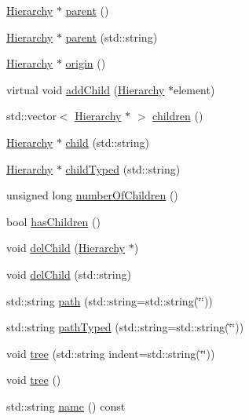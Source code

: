 \begin{DoxyCompactItemize}
\item 
\hyperlink{classHierarchy}{Hierarchy} $\ast$ \hyperlink{classHierarchy_a1c7bec8257e717f9c1465e06ebf845fc}{parent} ()
\item 
\hyperlink{classHierarchy}{Hierarchy} $\ast$ \hyperlink{classHierarchy_ad550588733bf75ac5c0fcfd7c8fd11a6}{parent} (std\+::string)
\item 
\hyperlink{classHierarchy}{Hierarchy} $\ast$ \hyperlink{classHierarchy_aee461dc930ce3871636ff87f075b1b83}{origin} ()
\item 
virtual void \hyperlink{classHierarchy_ad677774ff38fcb257c04a3a10d471fac}{add\+Child} (\hyperlink{classHierarchy}{Hierarchy} $\ast$element)
\item 
std\+::vector$<$ \hyperlink{classHierarchy}{Hierarchy} $\ast$ $>$ \hyperlink{classHierarchy_aa9a76f69e98e052ee1a6e32cea006288}{children} ()
\item 
\hyperlink{classHierarchy}{Hierarchy} $\ast$ \hyperlink{classHierarchy_a1e207f973c694b538bf90107b4868817}{child} (std\+::string)
\item 
\hyperlink{classHierarchy}{Hierarchy} $\ast$ \hyperlink{classHierarchy_a0c15a5276a3b80b4354d6bd8a01e0708}{child\+Typed} (std\+::string)
\item 
unsigned long \hyperlink{classHierarchy_ab16e84de65fd84e14001a6cf941c8be4}{number\+Of\+Children} ()
\item 
bool \hyperlink{classHierarchy_a255174fe4d316d2a3f430dcb9dab29f1}{has\+Children} ()
\item 
void \hyperlink{classHierarchy_a2b2b359fac003233f65786a616766bde}{del\+Child} (\hyperlink{classHierarchy}{Hierarchy} $\ast$)
\item 
void \hyperlink{classHierarchy_a1928ac7615fe0b5e55cd707f70dc6781}{del\+Child} (std\+::string)
\item 
std\+::string \hyperlink{classHierarchy_aa7990fa7caf132d83e361ce033c6c65a}{path} (std\+::string=std\+::string(\char`\"{}\char`\"{}))
\item 
std\+::string \hyperlink{classHierarchy_a1efd56cd164d328d2002e53a10a19b8c}{path\+Typed} (std\+::string=std\+::string(\char`\"{}\char`\"{}))
\item 
void \hyperlink{classHierarchy_a76e914b9a677a22a82deb74d892bf261}{tree} (std\+::string indent=std\+::string(\char`\"{}\char`\"{}))
\item 
void \hyperlink{classHierarchy_a594c294c5f60c230e106d522ed008212}{tree} ()
\item 
std\+::string \hyperlink{classObject_a300f4c05dd468c7bb8b3c968868443c1}{name} () const

\end{DoxyCompactItemize}
